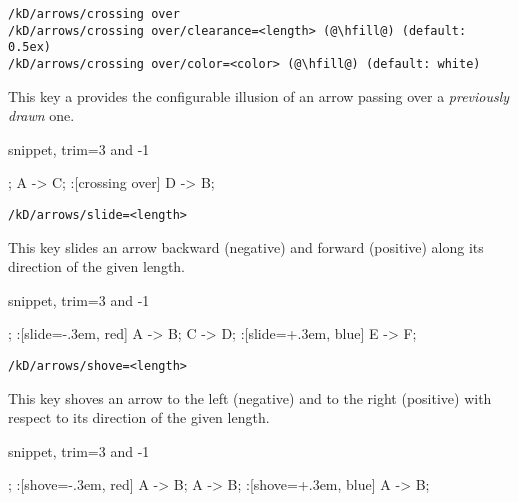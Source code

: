 \begin{lstlisting}
/kD/arrows/crossing over
/kD/arrows/crossing over/clearance=<length> (@\hfill@) (default: 0.5ex)
/kD/arrows/crossing over/color=<color> (@\hfill@) (default: white)
\end{lstlisting}

This key a provides the configurable illusion of an arrow passing
over a \emph{previously drawn} one.

\begin{tcblisting}{snippet, trim={3 and -1}}
\begin{kodi}[tetragonal=base 4.5em height 1em]
;
\mor A -> C;
\mor :[crossing over] D -> B;
\end{kodi}
\end{tcblisting}


\begin{lstlisting}
/kD/arrows/slide=<length>
\end{lstlisting}

This key slides an arrow backward (negative) and forward (positive) along its direction of the given length.

\begin{tcblisting}{snippet, trim={3 and -1}}
\begin{kodi}[tetragonal=base 4.5em height 1em]
;
\mor :[slide=-.3em, red] A -> B;
\mor C -> D;
\mor :[slide=+.3em, blue] E -> F;
\end{kodi}
\end{tcblisting}


\begin{lstlisting}
/kD/arrows/shove=<length>
\end{lstlisting}

This key shoves an arrow to the left (negative) and to the right (positive) with respect to its direction of the given length.

\begin{tcblisting}{snippet, trim={3 and -1}}
\begin{kodi}
;
\mor :[shove=-.3em, red] A -> B;
\mor A -> B;
\mor :[shove=+.3em, blue] A -> B;
\end{kodi}
\end{tcblisting}

